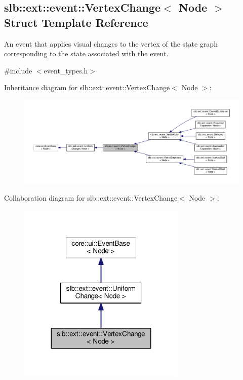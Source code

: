 \hypertarget{structslb_1_1ext_1_1event_1_1VertexChange}{}\subsection{slb\+:\+:ext\+:\+:event\+:\+:Vertex\+Change$<$ Node $>$ Struct Template Reference}
\label{structslb_1_1ext_1_1event_1_1VertexChange}


An event that applies visual changes to the vertex of the state graph corresponding to the state associated with the event.  




{\ttfamily \#include $<$event\+\_\+types.\+h$>$}



Inheritance diagram for slb\+:\+:ext\+:\+:event\+:\+:Vertex\+Change$<$ Node $>$\+:\nopagebreak
\begin{figure}[H]
\begin{center}
\leavevmode
\includegraphics[width=350pt]{structslb_1_1ext_1_1event_1_1VertexChange__inherit__graph}
\end{center}
\end{figure}


Collaboration diagram for slb\+:\+:ext\+:\+:event\+:\+:Vertex\+Change$<$ Node $>$\+:\nopagebreak
\begin{figure}[H]
\begin{center}
\leavevmode
\includegraphics[width=227pt]{structslb_1_1ext_1_1event_1_1VertexChange__coll__graph}
\end{center}
\end{figure}
